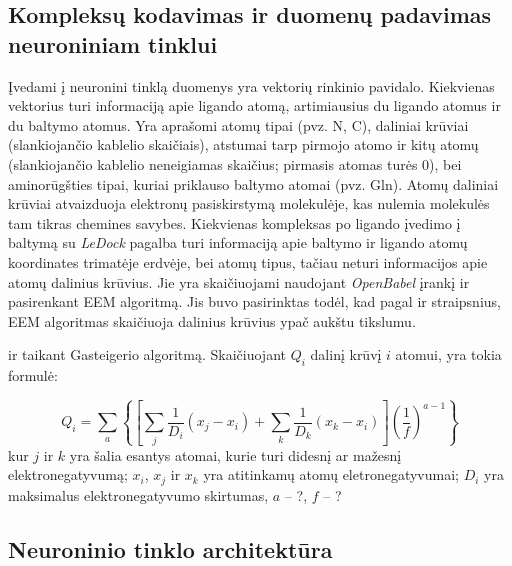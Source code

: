 
\subsection{Kompleksų kodavimas ir duomenų padavimas neuroniniam tinklui}

Įvedami į neuronini tinklą duomenys yra vektorių rinkinio pavidalo. Kiekvienas vektorius turi informaciją apie ligando atomą, artimiausius du ligando atomus ir du baltymo atomus. Yra aprašomi atomų tipai (pvz. N, C), daliniai krūviai (slankiojančio kablelio skaičiais), atstumai tarp pirmojo atomo ir kitų atomų (slankiojančio kablelio neneigiamas skaičius; pirmasis atomas turės 0), bei aminorūgšties tipai, kuriai priklauso baltymo atomai (pvz. Gln). Atomų daliniai krūviai atvaizduoja elektronų pasiskirstymą molekulėje, kas nulemia molekulės tam tikras chemines savybes.
Kiekvienas kompleksas po ligando įvedimo į baltymą su \emph{LeDock} pagalba turi informaciją apie baltymo ir ligando atomų koordinates trimatėje erdvėje, bei atomų tipus, tačiau neturi informacijos apie atomų dalinius krūvius. Jie yra skaičiuojami naudojant \emph{OpenBabel} įrankį ir pasirenkant EEM algoritmą. %
Jis buvo pasirinktas todėl, kad pagal \cite{} ir \cite{} straipsnius, EEM algoritmas skaičiuoja dalinius krūvius ypač aukštu tikslumu.


ir taikant Gasteigerio algoritmą. Skaičiuojant $Q_i$ dalinį krūvį $i$ atomui, yra tokia formulė\cite{gasteiger_new_1978}:

\begin{equation}
Q_{i}=\sum_{a}\left\{\left[\sum_{j} \frac{1}{D_{i}}\left(x_{j}-x_{i}\right)+\sum_{k} \frac{1}{D_{k}}\left(x_{k}-x_{i}\right)\right]\left(\frac{1}{f}\right)^{a-1}\right\}
\end{equation}
kur $j$ ir $k$ yra šalia esantys atomai, kurie turi didesnį ar mažesnį elektronegatyvumą; $x_i$, $x_j$ ir $x_k$ yra atitinkamų atomų eletronegatyvumai; $D_i$ yra maksimalus elektronegatyvumo skirtumas, $a$ -- ?, $f$ -- ?




\subsection{Neuroninio tinklo architektūra}

